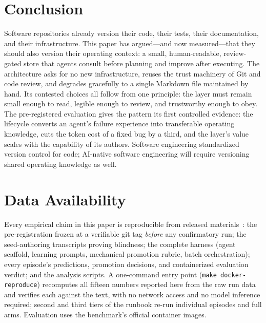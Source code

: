\documentclass[sigconf,review,anonymous]{acmart}
\begin{document}
\section{Conclusion}
Software repositories already version their code, their tests, their documentation, and their infrastructure. This paper has argued---and now measured---that they should also version their operating context: a small, human-readable, review-gated store that agents consult before planning and improve after executing. The architecture asks for no new infrastructure, reuses the trust machinery of Git and code review, and degrades gracefully to a single Markdown file maintained by hand. Its contested choices all follow from one principle: the layer must remain small enough to read, legible enough to review, and trustworthy enough to obey. The pre-registered evaluation gives the pattern its first controlled evidence: the lifecycle converts an agent's failure experience into transferable operating knowledge, cuts the token cost of a fixed bug by a third, and the layer's value scales with the capability of its authors. Software engineering standardized version control for code; AI-native software engineering will require versioning shared operating knowledge as well.

\section*{Data Availability}
Every empirical claim in this paper is reproducible from released materials~\cite{artifact}: the pre-registration frozen at a verifiable git tag \emph{before} any confirmatory run; the seed-authoring transcripts proving blindness; the complete harness (agent scaffold, learning prompts, mechanical promotion rubric, batch orchestration); every episode's predictions, promotion decisions, and containerized evaluation verdict; and the analysis scripts. A one-command entry point (\texttt{make docker-reproduce}) recomputes all fifteen numbers reported here from the raw run data and verifies each against the text, with no network access and no model inference required; second and third tiers of the runbook re-run individual episodes and full arms. Evaluation uses the benchmark's official container images.
\end{document}
